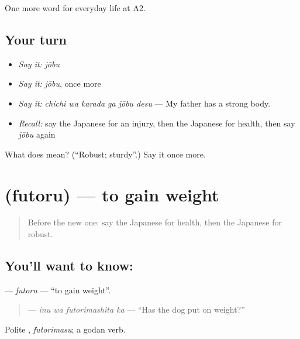 \begin{grammarlens}[title={What you've built}]
One more word for everyday life at A2.
\end{grammarlens}

\subsection*{Your turn}
\begin{itemize}
\raggedright
  \item \emph{Say it:} \emph{jōbu}
  \item \emph{Say it:} \emph{jōbu}, once more
  \item \emph{Say it:} \emph{chichi wa karada ga jōbu desu} — My father has a strong body.
  \item \emph{Recall:} say the Japanese for an injury, then the Japanese for health, then say \emph{jōbu} again
\end{itemize}

\begin{tcolorbox}[breakable,colback=teal!4,colframe=teal!35!black,title={Before you move on}]
What does  mean? (\textquotedblleft{}Robust; sturdy\textquotedblright{}.) Say it once more.
\end{tcolorbox}
\section[\texorpdfstring{\ja{ふとる} (futoru)}{ふとる (futoru)}]{ (futoru) — to gain weight}

\label{lesson:JA-C220-futoru}



\begin{quote}
Before the new one: say the Japanese for health, then the Japanese for robust.
\end{quote}

\subsection*{You'll want to know: }
\textbf{} — \emph{futoru} — \textquotedblleft{}to gain weight\textquotedblright{}.

\begin{quote}
\textbf{ } — \emph{inu wa futorimashita ka} — \textquotedblleft{}Has the dog put on weight?\textquotedblright{}
\end{quote}

Polite \textbf{}, \emph{futorimasu}; a godan verb.

